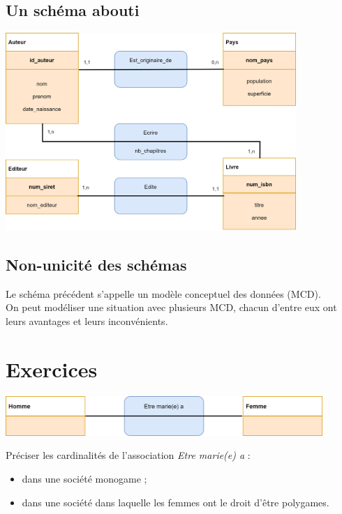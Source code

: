 \subsection{Un schéma abouti}
\begin{center}
    \includegraphics[width=11cm]{img/schema_2}
\end{center}

\subsection{Non-unicité des schémas}
Le schéma précédent s'appelle un modèle conceptuel des données (MCD).\\
On peut modéliser une situation avec plusieurs MCD, chacun d'entre eux ont leurs avantages et leurs inconvénients.

\section{Exercices}

\begin{exercice}[]
    \begin{center}
        \includegraphics[width=12cm]{img/ex1}
    \end{center}
    Préciser les cardinalités de l'association \textit{Etre marie(e) a} :
    \begin{itemize}
        \item 	dans une société monogame ;
        \item 	dans une société dans laquelle les femmes ont le droit d'être polygames.
    \end{itemize}
\end{exercice}


